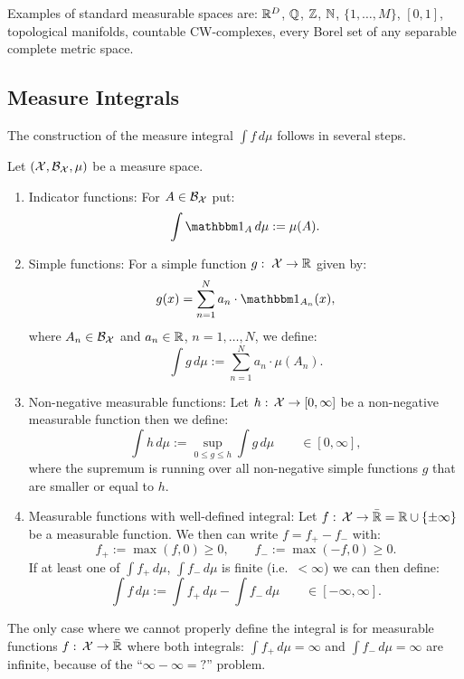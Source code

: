 \begin{Eg}
    Examples of standard measurable spaces are: $\mathbb{R}^D$, $\mathbb{Q}$, $\mathbb{Z}$, $\mathbb{N}$, $\{1,\dots,M\}$,  $[0,1]$, topological manifolds, countable CW-complexes, 
    every Borel set of any separable complete metric space.
\end{Eg}



\subsection{Measure Integrals}
\label{sec:measure-integral}


The construction of the measure integral $\int f\,d\mu$ follows in several steps.

\begin{Construction}
    Let $(\mathcal{X},\mathcal{B}_{\mathcal{X}},\mu)$ be a measure space.
    \begin{enumerate}
        \item Indicator functions: For $A \in \mathcal{B}_{\mathcal{X}}$ put:
            \[\int \I_A\,d\mu := \mu(A).\]
        \item Simple functions: For a simple function $g:\; \mathcal{X} \to \mathbb{R}$ given by: 
            \[ g(x)= \sum_{n=1}^N a_n \cdot \I_{A_n}(x), \]
            where  $A_n \in \mathcal{B}_{\mathcal{X}}$ %
            and $a_n \in \mathbb{R}$, $n=1,\dots,N$, we define: 
            \[ \int g\,d\mu := \sum_{n=1}^N a_n \cdot \mu(A_n). \]
        \item Non-negative measurable functions: Let $h:\, \mathcal{X} \to [0,\infty]$ be a non-negative measurable function then we define:
            \[ \int h\, d\mu := \sup_{0 \le g \le h} \int g \, d\mu \qquad \in [0,\infty], \]
            where the supremum is running over all non-negative simple functions $g$ that are smaller or equal to $h$.
        \item Measurable functions with well-defined integral: Let $f:\, \mathcal{X} \to \bar{\mathbb{R}}=\mathbb{R} \cup \{\pm \infty\}$ be a measurable function. 
            We then can  write  $f=f_+-f_-$ with:
            \[ f_+ := \max(f,0) \ge 0, \qquad f_-:= \max(-f,0) \ge 0.\]
            If at least one of $\int f_+\,d\mu$,  $\int f_-\,d\mu$ is finite (i.e.\ $< \infty$)
            we can then define:
            \[ \int f\, d\mu := \int f_+\,d\mu - \int f_-\,d\mu \qquad \in [-\infty,\infty].\]
        \end{enumerate}
   The only case where we cannot properly define the integral is for measurable functions $f:\, \mathcal{X} \to \bar {\mathbb{R}}$ where both integrals: 
   $\int f_+ \,d\mu = \infty$ and $\int f_-\,d\mu = \infty$ are infinite, because of the ``$\infty - \infty = ?$'' problem.

\end{Construction}

